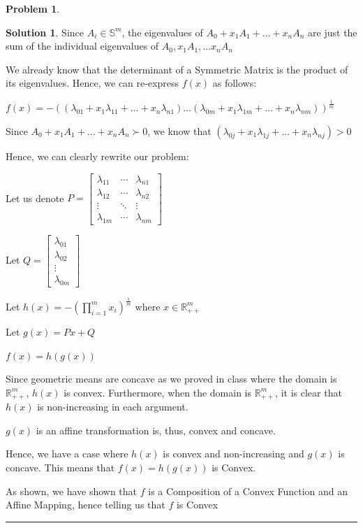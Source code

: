 \documentclass{article}
\theoremstyle{definition}
\newtheorem{problem}{Problem}
\def\fline{\rule{0.75\linewidth}{0.5pt}}
\newcommand{\finishline}{\begin{center}\fline\end{center}}
\newtheorem*{solution*}{Solution}
\newenvironment{solution}{\begin{solution*}}{{\finishline} \end{solution*}}
\begin{document}
\begin{problem}
\begin{itemize}
\begin{solution}
        Since $A_i \in \mathbb{S}^m$, the eigenvalues of $A_0 + x_1 A_1 + \dots + x_n A_n$ are just the sum of the individual eigenvalues of $A_0, x_1 A_1, \dots x_n A_n$

        We already know that the determinant of a Symmetric Matrix is the product of its eigenvalues. Hence, we can re-express $f(x)$ as follows: \newline 

        $f(x) = - ((\lambda_{01} + x_1 \lambda_{11} + \dots + x_n \lambda_{n1}) \dots (\lambda_{0m} + x_1 \lambda_{1m} + \dots + x_n \lambda_{nm}))^{\frac{1}{m}}$

        Since $A_0 + x_1 A_1 + \dots + x_n A_n \succ 0$, we know that $(\lambda_{0j} + x_1 \lambda_{1j} + \dots + x_n \lambda_{nj}) > 0$

Hence, we can clearly rewrite our problem: \newline 

        Let us denote $P = \begin{bmatrix}
    \lambda_{11} & \cdots & \lambda_{n1} \\
    \lambda_{12} & \cdots & \lambda_{n2} \\
    \vdots & \ddots & \vdots \\
    \lambda_{1m} & \cdots & \lambda_{nm}
\end{bmatrix}$

Let $Q = \begin{bmatrix}
    \lambda_{01} \\
    \lambda_{02} \\
    \vdots \\
    \lambda_{0m}
\end{bmatrix}$

Let $h(x) = - (\prod_{i=1}^{m} x_i)^{\frac{1}{m}}$ where $x \in \mathbb{R}^m_{++}$ \newline 

Let $g(x) = Px + Q$

$f(x) = h(g(x))$ \newline 

Since geometric means are concave as we proved in class where the domain is $\mathbb{R}^m_{++}$, $h(x)$ is convex. Furthermore, when the domain is $\mathbb{R}^m_{++}$, it is clear that $h(x)$ is non-increasing in each argument. 

$g(x)$ is an affine transformation is, thus, convex and concave. 
        
Hence, we have a case where $h(x)$ is convex and non-increasing and $g(x)$ is concave. This means that $f(x) = h(g(x))$ is Convex. 

As shown, we have shown that $f$ is a Composition of a Convex Function and an Affine Mapping, hence telling us that $f$ is Convex
    \end{solution}
\end{itemize}
\end{problem}
\end{document}
